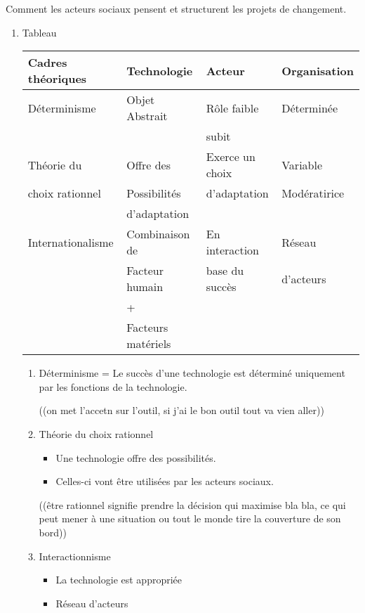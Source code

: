\documentclass[11pt]{article}
\begin{document}
\begin{enumerate}
\begin{enumerate}
\begin{enumerate}
\begin{enumerate}
Comment les acteurs sociaux pensent et structurent les projets de changement.
\begin{enumerate}
\item Tableau
\label{sec:orgce040e4}
\begin{center}
\begin{tabular}{llll}
\hline
Cadres théoriques & Technologie & Acteur & Organisation\\
\hline
\hline
Déterminisme & Objet Abstrait & Rôle faible & Déterminée\\
 &  & subit & \\
\hline
Théorie du & Offre des & Exerce un choix & Variable\\
choix rationnel & Possibilités & d'adaptation & Modératirice\\
 & d'adaptation &  & \\
\hline
Internationalisme & Combinaison de & En interaction & Réseau\\
 & Facteur humain & base du succès & d'acteurs\\
 & + &  & \\
 & Facteurs matériels &  & \\
\hline
\end{tabular}
\end{center}

\begin{enumerate}
\item Déterminisme = Le succès d'une technologie est déterminé uniquement par les
fonctions de la technologie.

((on met l'accetn sur l'outil, si j'ai le bon outil tout va vien aller))

\item Théorie du choix rationnel

\begin{itemize}
\item Une technologie offre des possibilités.
\item Celles-ci vont être utilisées par les acteurs sociaux.
\end{itemize}

((être rationnel signifie prendre la décision qui maximise bla bla, ce qui
peut mener à une situation ou tout le monde tire la couverture de son bord))

\item Interactionnisme

\begin{itemize}
\item La technologie est appropriée
\item Réseau d'acteurs
\end{itemize}


\end{enumerate}
\end{enumerate}
\end{enumerate}
\end{enumerate}
\end{enumerate}
\end{enumerate}
\end{document}
